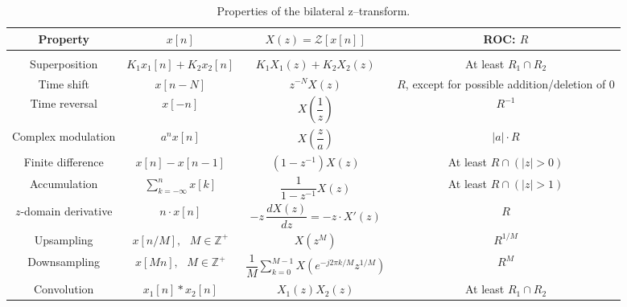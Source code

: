 \documentclass{report}
\begin{document}
\begin{table}[hbt!]
    \centering
    \caption{Properties of the bilateral z--transform.}
    \label{z_prop}
    \begin{tabular}{|c|c|c|c|}
        \hline
        Property & $x[n]$ & $X(z)=\mathcal{Z}[x[n]]$ & ROC: $R$ \\[0.15cm]
        \hline
        & & & \\
        Superposition & $K_1x_1[n]+K_2x_2[n]$ & $K_1X_1(z)+K_2X_2(z)$ & At least $R_1\cap R_2$ \\[0.5cm]
        Time shift & $x[n-N]$ & $z^{-N}X(z)$ & \shortstack{$R$, except for possible \\ addition/deletion of 0} \\[0.5cm]
        Time reversal & $x[-n]$ & $X\left(\dfrac{1}{z}\right)$ & $R^{-1}$ \\[0.5cm]
        Complex modulation & $a^n x[n]$ & $X\left(\dfrac{z}{a}\right)$ & $|a|\cdot R$ \\[0.5cm]
        Finite difference & $x[n]-x[n-1]$ & $(1-z^{-1})X(z)$ & At least $R\cap(|z|>0)$ \\[0.5cm]
        Accumulation & $\displaystyle\sum_{k=-\infty}^{n} x[k]$ & $\dfrac{1}{1-z^{-1}} X(z)$ & At least $R\cap(|z|>1)$ \\[0.5cm]
        $z$-domain derivative & $n\cdot x[n]$ & $-z\,\dfrac{dX(z)}{dz} = -z\cdot X'(z)$ & $R$ \\[0.5cm]
        Upsampling & $x[n/M],\text{ } M\in\mathbb{Z}^+$ & $X(z^M)$ & $R^{1/M}$ \\[0.5cm]
        Downsampling & $x[Mn],\text{ } M\in\mathbb{Z}^+$ & $\dfrac{1}{M}\displaystyle\sum_{k=0}^{M-1}X(e^{-j2\pi k/M}z^{1/M})$ & $R^M$ \\[0.5cm]
        Convolution & $x_1[n]*x_2[n]$ & $X_1(z)X_2(z)$ & At least $R_1\cap R_2$ \\[0.5cm]
        \hline
    \end{tabular}
\end{table}
\end{document}
